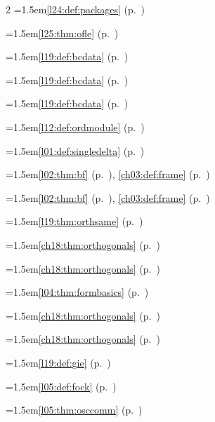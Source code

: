 \begin{multicols}{2}
\hangindent=1.5em\quad \ref{l24:def:packages} (p.~\pageref{l24:def:packages})\par
\hangindent=1.5em\quad \ref{l25:thm:ofle} (p.~\pageref{l25:thm:ofle})\par
\hangindent=1.5em\quad \ref{l19:def:bcdata} (p.~\pageref{l19:def:bcdata})\par
\hangindent=1.5em\quad \ref{l19:def:bcdata} (p.~\pageref{l19:def:bcdata})\par
\hangindent=1.5em\quad \ref{l19:def:bcdata} (p.~\pageref{l19:def:bcdata})\par
\hangindent=1.5em\quad \ref{l12:def:ordmodule} (p.~\pageref{l12:def:ordmodule})\par
\hangindent=1.5em\quad \ref{l01:def:singledelta} (p.~\pageref{l01:def:singledelta})\par
\hangindent=1.5em\quad \ref{l02:thm:bf} (p.~\pageref{l02:thm:bf}), \ref{ch03:def:frame} (p.~\pageref{ch03:def:frame})\par
\hangindent=1.5em\quad \ref{l02:thm:bf} (p.~\pageref{l02:thm:bf}), \ref{ch03:def:frame} (p.~\pageref{ch03:def:frame})\par
\hangindent=1.5em\quad \ref{l19:thm:orthsame} (p.~\pageref{l19:thm:orthsame})\par
\hangindent=1.5em\quad \ref{ch18:thm:orthogonals} (p.~\pageref{ch18:thm:orthogonals})\par
\hangindent=1.5em\quad \ref{ch18:thm:orthogonals} (p.~\pageref{ch18:thm:orthogonals})\par
\hangindent=1.5em\quad \ref{l04:thm:formbasics} (p.~\pageref{l04:thm:formbasics})\par
\hangindent=1.5em\quad \ref{ch18:thm:orthogonals} (p.~\pageref{ch18:thm:orthogonals})\par
\hangindent=1.5em\quad \ref{ch18:thm:orthogonals} (p.~\pageref{ch18:thm:orthogonals})\par
\hangindent=1.5em\quad \ref{l19:def:gie} (p.~\pageref{l19:def:gie})\par
\hangindent=1.5em\quad \ref{l05:def:fock} (p.~\pageref{l05:def:fock})\par
\hangindent=1.5em\quad \ref{l05:thm:osccomm} (p.~\pageref{l05:thm:osccomm})\par

\end{multicols}
